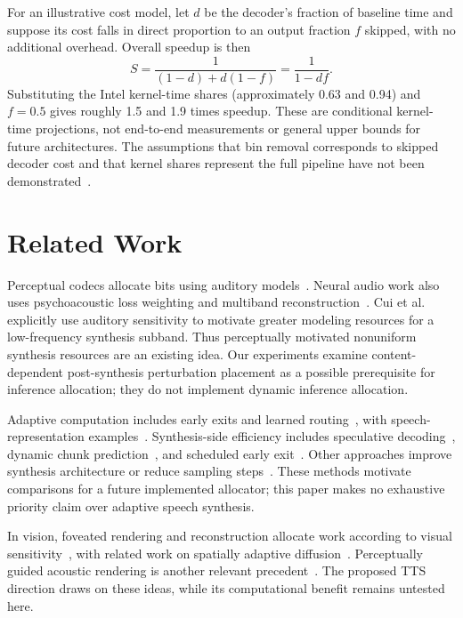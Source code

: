 \documentclass[11pt,a4paper]{article}
\begin{document}
For an illustrative cost model, let $d$ be the decoder's fraction of baseline time and suppose its cost falls in direct proportion to an output fraction $f$ skipped, with no additional overhead. Overall speedup is then
\[
 S=\frac{1}{(1-d)+d(1-f)}=\frac{1}{1-df}.
\]
Substituting the Intel kernel-time shares (approximately 0.63 and 0.94) and $f=0.5$ gives roughly 1.5 and 1.9 times speedup. These are conditional kernel-time projections, not end-to-end measurements or general upper bounds for future architectures. The assumptions that bin removal corresponds to skipped decoder cost and that kernel shares represent the full pipeline have not been demonstrated~\cite{amdahl1967validity}.

\section{Related Work}
Perceptual codecs allocate bits using auditory models~\cite{iso11172,painter2000perceptual,bosi2003introduction}. Neural audio work also uses psychoacoustic loss weighting and multiband reconstruction~\cite{zhen2018psychoacoustically,zhen2020calibration,muffin2025}. Cui et al.~\cite{cui2020subband} explicitly use auditory sensitivity to motivate greater modeling resources for a low-frequency synthesis subband. Thus perceptually motivated nonuniform synthesis resources are an existing idea. Our experiments examine content-dependent post-synthesis perturbation placement as a possible prerequisite for inference allocation; they do not implement dynamic inference allocation.

Adaptive computation includes early exits and learned routing~\cite{teerapittayanon2016branchynet,schuster2022calm,han2022dynamic,raposo2024mixture}, with speech-representation examples~\cite{daisy2024}. Synthesis-side efficiency includes speculative decoding~\cite{leviathan2023fast,chen2023accelerating,ssd2025}, dynamic chunk prediction~\cite{dcar2025}, and scheduled early exit~\cite{spark2026}. Other approaches improve synthesis architecture or reduce sampling steps~\cite{valin2019lpcnet,ren2021fastspeech2,zheng2025epss}. These methods motivate comparisons for a future implemented allocator; this paper makes no exhaustive priority claim over adaptive speech synthesis.

In vision, foveated rendering and reconstruction allocate work according to visual sensitivity~\cite{guenter2012foveated,patney2016foveated,kaplanyan2019deepfovea}, with related work on spatially adaptive diffusion~\cite{foveateddiffusion2026}. Perceptually guided acoustic rendering is another relevant precedent~\cite{peng2025foveation}. The proposed TTS direction draws on these ideas, while its computational benefit remains untested here.
\end{document}

